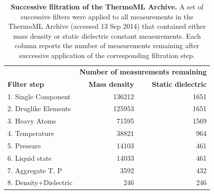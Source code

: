 \documentclass[aps,pre,twocolumn,nofootinbib,superscriptaddress,linenumbers]{revtex4-1}
\begin{document}

\begin{table}
\begin{tabular}{lrr}
\hline
 &  \multicolumn{2}{c}{\bf Number of measurements remaining} \\ \cline{2-3}
{\bf Filter step} &  {\bf Mass density} &  {\bf Static dielectric} \\ 
\hline
1.  Single Component   &               136212 &                                     1651 \\
2.  Druglike Elements  &               125953 &                                     1651 \\
3.  Heavy Atoms        &                71595 &                                     1569 \\
4.  Temperature        &                38821 &                                      964 \\
5.  Pressure           &                14103 &                                      461 \\
6.  Liquid state       &                14033 &                                      461 \\
7.  Aggregate T, P     &                 3592 &                                      432 \\
8.  Density+Dielectric &                  246 &                                      246 \\

\hline
\end{tabular}
\caption{{\bf Successive filtration of the ThermoML Archive.}
A set of successive filters were applied to all measurements in the ThermoML Archive (accessed 13 Sep 2014) that contained either mass density or static dielectric constant measurements.
Each column reports the number of measurements remaining after successive application of the corresponding filtration step.
}
\label{table:ThermoMLSummary}
\end{table}
\end{document}
